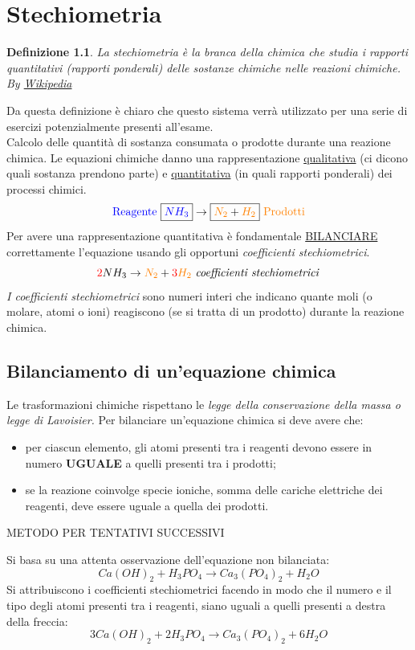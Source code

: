 \documentclass{book}
\newtheorem{definizione}{Definizione}
\begin{document}
\chapter{Stechiometria}
\begin{definizione}
La stechiometria è la branca della chimica che studia i rapporti quantitativi (rapporti ponderali) delle sostanze chimiche nelle reazioni chimiche.\\
By \href{https://it.wikipedia.org/wiki/Stechiometria}{Wikipedia}
\end{definizione}
Da questa definizione è chiaro che questo sistema verrà utilizzato per una
serie di esercizi potenzialmente presenti all'esame.\\
Calcolo delle quantità di sostanza consumata o prodotte durante una reazione chimica. Le equazioni chimiche danno una rappresentazione \underline{qualitativa} (ci dicono quali sostanza prendono parte) e \underline{quantitativa} (in quali rapporti ponderali) dei processi chimici.
\begin{equation}
	\text{\color{blue}Reagente } \boxed{\color{blue}NH_3}\to\boxed{{\color{orange}N_2}+{\color{orange}H_2}} \text{ \color{orange}Prodotti}
\end{equation}
Per avere una rappresentazione quantitativa è fondamentale \underline{BILANCIARE} correttamente l'equazione usando gli opportuni \textit{coefficienti stechiometrici}.
\begin{equation}
	{\color{red}2}NH_3\to{\color{orange}N_2}+{\color{red}3}{\color{orange}H_2} \text{ \textit{coefficienti stechiometrici}} 
\end{equation}
\textit{I coefficienti stechiometrici} sono numeri interi che indicano quante moli (o molare, atomi o ioni) reagiscono (se si tratta di un prodotto) durante la reazione chimica.
\section{Bilanciamento di un'equazione chimica}
Le trasformazioni chimiche rispettano le \textit{{\color{blue}legge della conservazione della massa} o {\color{blue}legge di Lavoisier}.} Per bilanciare un'equazione chimica si deve avere che:
\begin{itemize}
\item per ciascun elemento, gli atomi presenti tra i reagenti devono essere in numero \textbf{UGUALE} a quelli presenti tra i prodotti;
\item se la reazione coinvolge specie ioniche, somma delle cariche elettriche dei reagenti, deve essere uguale a quella dei prodotti.
\end{itemize}
\begin{center}
	METODO PER TENTATIVI SUCCESSIVI
\end{center}
Si basa su una attenta osservazione dell'equazione non bilanciata:
\begin{equation}
	Ca(OH)_2+H_3PO_4\to Ca_3(PO_4)_2+H_2O
\end{equation}
Si attribuiscono i coefficienti stechiometrici facendo in modo che il numero e il tipo degli atomi presenti tra i reagenti, siano uguali a quelli presenti a destra della freccia:
\begin{equation}
	3Ca(OH)_2+2H_3PO_4\to Ca_3(PO_4)_2+6H_2O
\end{equation}
\end{document}
